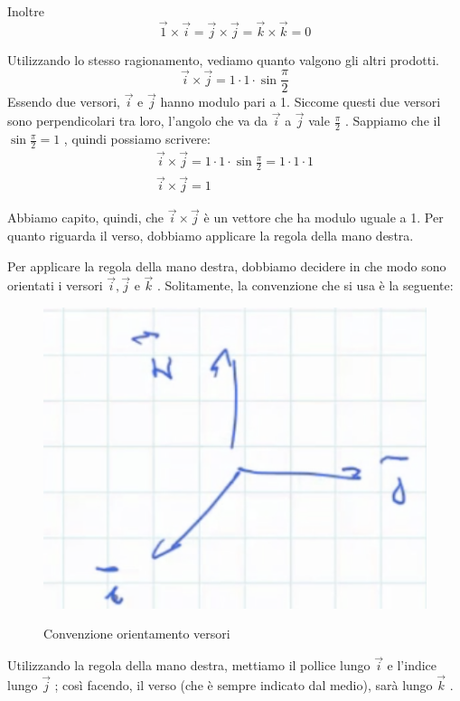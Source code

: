Inoltre
$$ \overrightarrow{1} \times \overrightarrow{i} = \overrightarrow{j} \times \overrightarrow{j} = \overrightarrow{k} \times \overrightarrow{k} = 0 $$

Utilizzando lo stesso ragionamento, vediamo quanto valgono gli altri prodotti.
$$ \overrightarrow{i} \times \overrightarrow{j} = 1 \cdot 1 \cdot \sin \frac{\pi}{2} $$
Essendo due versori, $ \overrightarrow{i} $ e $ \overrightarrow{j} $ hanno modulo pari a 1. Siccome questi due versori sono perpendicolari tra loro, l'angolo che va da $\overrightarrow{i} $ a $\overrightarrow{j} $ vale $ \frac{\pi}{2} $ .  Sappiamo che il $ \sin \frac{\pi}{2} = 1 $ , quindi possiamo scrivere:
\begin{align*}
\overrightarrow{i} \times \overrightarrow{j} = 1 \cdot 1 \cdot \sin \frac{\pi}{2} = 1 \cdot 1 \cdot 1 \\
\overrightarrow{i} \times \overrightarrow{j} = 1
\end{align*}

Abbiamo capito, quindi, che $ \overrightarrow{i} \times \overrightarrow{j} $ è un vettore che ha modulo uguale a 1. Per quanto riguarda il verso, dobbiamo applicare la regola della mano destra.

Per applicare la regola della mano destra, dobbiamo decidere in che modo sono orientati i versori $ \overrightarrow{i} , \overrightarrow{j} $ e $ \overrightarrow{k} $ . Solitamente, la convenzione che si usa è la seguente:

\begin{figure}[h]
\begin{center}
\includegraphics[width = 0.5 \textwidth]{lezione1/images/convenzione versori}
\label{fig:convenzione}
\caption{Convenzione orientamento versori}
\end{center}
\end{figure}

Utilizzando la regola della mano destra, mettiamo il pollice lungo $ \overrightarrow{i} $ e l'indice lungo $ \overrightarrow{j} $ ; così facendo, il verso (che è sempre indicato dal medio), sarà lungo $ \overrightarrow{k} $ .

